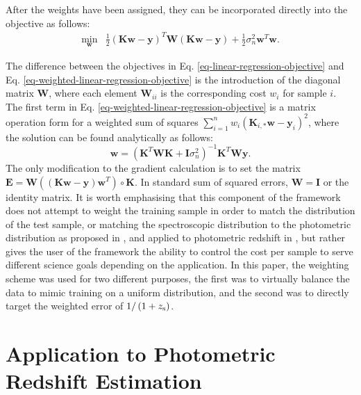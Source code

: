 \documentclass[useAMS,usenatbib,fleqn]{mn2e}
\begin{document}
After the weights have been assigned, they can be incorporated directly into the objective as follows:
\begin{equation}
\label{eq-weighted-linear-regression-objective}
\begin{array}{lcl}
\underset{\mathbf{w}}{\text{min}} &\frac{1}{2}\left ( \mathbf{K}\mathbf{w}-\mathbf{y} \right )^{T} \mathbf{W}\left( \mathbf{K}\mathbf{w}-\mathbf{y} \right )+\frac{1}{2}\sigma_{n}^{2}\mathbf{w}^{T}\mathbf{w}.
\end{array}
\end{equation}

The difference between the objectives in Eq. \eqref{eq-linear-regression-objective} and Eq. \eqref{eq-weighted-linear-regression-objective} is the introduction of the diagonal matrix $\mathbf{W}$, where each element $\mathbf{W}_{ii}$ is the corresponding cost $w_{i}$ for sample $i$. The first term in Eq. \eqref{eq-weighted-linear-regression-objective} is a matrix operation form for a weighted sum of squares $\sum_{i=1}^{n}w_{i}\left(\mathbf{K}_{i,*}\mathbf{w}-\mathbf{y}_{i}\right)^{2}$, where the solution can be found analytically as follows:
\begin{equation}
\label{eq-weighted-linear-regression-objective-rectangular}
\mathbf{w} = \left(\mathbf{K}^{T}\mathbf{WK}+\mathbf{I}\sigma_{n}^{2} \right)^{-1}\mathbf{K}^{T}\mathbf{W}\mathbf{y}.
\end{equation}
The only modification to the gradient calculation is to set the matrix $\mathbf{E}=\mathbf{W}\left(\left(\mathbf{K}\mathbf{w}-\mathbf{y}\right)\mathbf{w}^{T}\right)\circ\mathbf{K}$. In standard sum of squared errors, $ \mathbf{W}= \mathbf{I}$ or the identity matrix. It is worth emphasising that this component of the framework does not attempt to weight the training sample in order to match the distribution of the test sample, or matching the spectroscopic distribution to the photometric distribution as proposed in \citet{Lima2008}, \citet{Cunha2009} and applied to photometric redshift in \citet{sanchez14}, but rather gives the user of the framework the ability to control the cost per sample to serve different science goals depending on the application. In this paper, the weighting scheme was used for two different purposes, the first was to virtually balance the data to mimic training on a uniform distribution, and the second was to directly target the weighted error of $1/\left(1+z_{\rm s}\right)$.

\section{Application to Photometric Redshift Estimation}
\label{sec-application}
\end{document}
